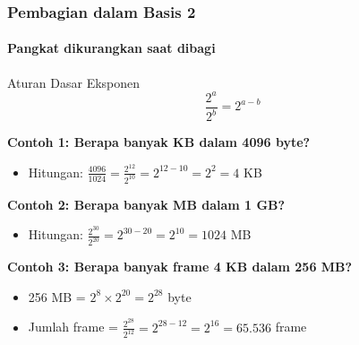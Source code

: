 \documentclass[t,aspectratio=169,xcolor=dvipsnames]{beamer}
\begin{document}
\begin{frame}
    \frametitle{Pembagian dalam Basis 2}
    \framesubtitle{Pangkat dikurangkan saat dibagi}
    \scriptsize

    \begin{block}{Aturan Dasar Eksponen}
        \[
        \frac{2^a}{2^b} = 2^{a-b}
        \]
    \end{block}

    \vspace{0.2cm}
    \textbf{Contoh 1: Berapa banyak KB dalam 4096 byte?}
    \begin{itemize}
        \item Hitungan: $\frac{4096}{1024} = \frac{2^{12}}{2^{10}} = 2^{12-10} = 2^2 = 4$ KB
    \end{itemize}

    \vspace{0.2cm}
    \textbf{Contoh 2: Berapa banyak MB dalam 1 GB?}
    \begin{itemize}
        \item Hitungan: $\frac{2^{30}}{2^{20}} = 2^{30-20} = 2^{10} = 1024$ MB
    \end{itemize}

    \vspace{0.2cm}
    \textbf{Contoh 3: Berapa banyak frame 4 KB dalam 256 MB?}
    \begin{itemize}
        \item 256 MB = $2^8 \times 2^{20} = 2^{28}$ byte
        \item Jumlah frame = $\frac{2^{28}}{2^{12}} = 2^{28-12} = 2^{16} = 65.536$ frame
    \end{itemize}
\end{frame}
\end{document}
